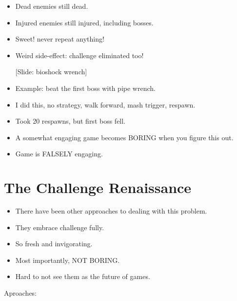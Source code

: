 \documentclass[12pt]{article}
\begin{document}
{\begin{itemize}
\item Dead enemies still dead.

\item Injured enemies still injured, including bosses.

\item Sweet!  never repeat anything!

\item Weird side-effect:  challenge eliminated too!


[Slide:  bioshock wrench]

\item Example:  beat the first boss with pipe wrench.

\item I did this, no strategy, walk forward, mash trigger, respawn.

\item Took 20 respawns, but first boss fell.

\item A somewhat engaging game becomes BORING when you figure this out.

\item Game is FALSELY engaging.




\end{itemize}


\section{The Challenge Renaissance}
\begin{itemize}
\item There have been other approaches to dealing with this problem.

\item They embrace challenge fully.

\item So fresh and invigorating.

\item Most importantly, NOT BORING.

\item Hard to not see them as the future of games.

\end{itemize}



\noindent Aproaches:

\begin{enumerate}





\end{enumerate}}
\end{document}

